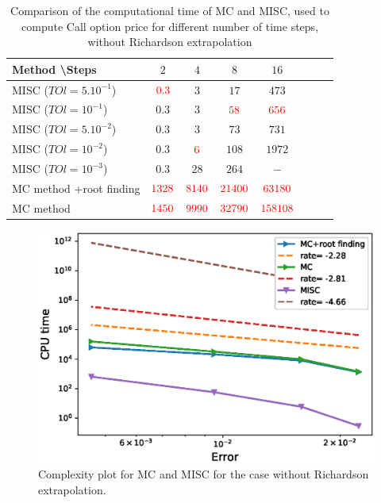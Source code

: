 \documentclass[11pt]{article}
\begin{document}
\begin{table}[h!]
	\centering
	\begin{tabular}{l*{6}{c}r}
		Method \textbackslash  Steps            & $2$ & $4$ & $8$ & $16$ &   \\
		\hline
		MISC ($TOl=5.10^{-1}$) & ${\color{red}0.3}$ & $3$ & $17$ & $473$  \\
		MISC ($TOl=10^{-1}$)  & $0.3$ & $3$ & ${\color{red}58}$ & ${\color{red}656}$  \\
		MISC ($TOl=5.10^{-2}$)   & $0.3$ & $3$ & $73$ & $731$  \\
		MISC ($TOl=10^{-2}$)  & $0.3$ & ${\color{red}6}$ & $108$ & $1972$  \\
		MISC ($TOl=10^{-3}$)   & $0.3$ & $28$ & $264$ & $-$  \\
		\hline
			MC method +root finding   & ${\color{red}1328}$ & ${\color{red}8140}$ & ${\color{red}21400}$ & ${\color{red}63180}$  \\
				MC method & ${\color{red}1450}$ & ${\color{red}9990}$ & ${\color{red}32790}$ & ${\color{red} 158108
				}$  \\
		\hline
	\end{tabular}
	\caption{Comparison of the computational time of  MC and MISC, used to compute Call option price  for different number of time steps, without Richardson extrapolation}
	\label{Comparsion of the computational time of  MC and MISC, used to compute Call option price  for different number of time steps, without Richardson extrapolation}
\end{table}




	\begin{figure}[h!]
\centering
\includegraphics[width=0.7\linewidth]{./figures/Call_Complexity_rates/error_vs_time}

\caption{Complexity plot for MC and MISC for the case without Richardson extrapolation.}
\label{fig:Complexity plot for MC and MISC , Binary, non rich}
\end{figure}
\end{document}
